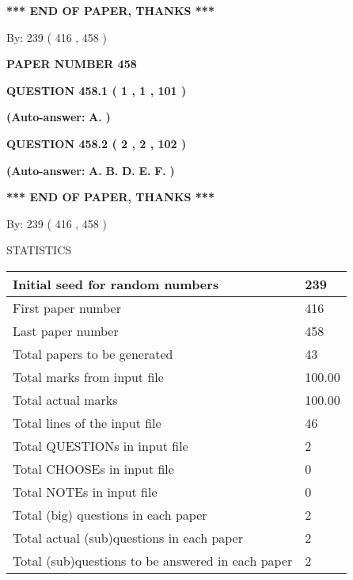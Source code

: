 \documentclass[12pt]{article}
\begin{document}
 
   
   
\vspace{1.0in} 
{\textbf{\large{ *** END OF PAPER, THANKS *** }}} 
   
   
\hspace{1.0in} By: 
 239 ( 416 ,  458 )
   
   
   
   
\newpage 
\setcounter{page}{ 
   458001 } 
   
   
 {\textbf{ \Large{ PAPER NUMBER  458  }}}
   
   
  
  
{\textbf{\large{QUESTION
458.1 
 ( 1 , 1 , 101 )
}}}
 
 
{\textbf{(Auto-answer:}}
{\textbf{\large{
A.}}}
{\textbf{)}}
 
 
  
  
{\textbf{\large{QUESTION
458.2 
 ( 2 , 2 , 102 )
}}}
 
 
{\textbf{(Auto-answer:}}
{\textbf{\large{
A.}}}
{\textbf{\large{
B.}}}
{\textbf{\large{
D.}}}
{\textbf{\large{
E.}}}
{\textbf{\large{
F.}}}
{\textbf{)}}
 
 
   
   
\vspace{1.0in} 
{\textbf{\large{ *** END OF PAPER, THANKS *** }}} 
   
   
\hspace{1.0in} By: 
 239 ( 416 ,  458 )
   
   
   
\vspace{0.2in}
\vspace{0.2in}
   
   
 \newpage
\setcounter{page}{1} 
   
   
 {\LARGE{STATISTICS}}
   
\vspace{0.2in}
   
 \begin{tabular}{|l|l|}
 \hline
 Initial seed for random numbers & 239  \\
\hline
 First paper number & 416  \\
\hline
 Last  paper number & 458  \\
\hline
 Total papers to be generated & 43  \\
\hline
Total marks from input file & 100.00 \\
\hline
Total actual marks & 100.00 \\
\hline
 Total lines of the input file & 46  \\
 \hline
 Total QUESTIONs in input file & 2  \\
\hline
 Total CHOOSEs in input file & 0  \\
\hline
 Total NOTEs in input file & 0  \\
\hline
 Total (big) questions in each paper & 2  \\
\hline
 Total actual (sub)questions in each paper & 2  \\
\hline
 Total (sub)questions to be answered in each paper & 2  \\
\hline
 \end{tabular}
   
\end{document}

